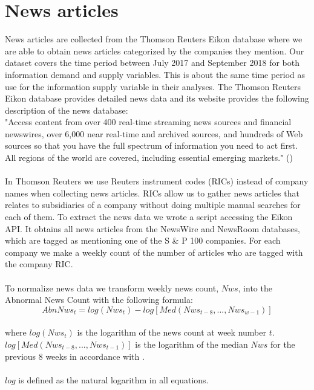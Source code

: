 \section{News articles}
News articles are collected from the Thomson Reuters Eikon database where we are able to obtain news articles categorized by the companies they mention. Our dataset covers the time period between July 2017 and September 2018 for both information demand and supply variables. This is about the same time period as \cite{vlastakis} use for the information supply variable in their analyses. The Thomson Reuters Eikon database provides detailed news data and its website provides the following description of the news database:
\\
"Access content from over 400 real-time streaming news sources and financial newswires, over 6,000 near real-time and archived sources, and hundreds of Web sources so that you have the full spectrum of information you need to act first. All regions of the world are covered, including essential emerging markets." (\cite{descriptionThomsonReutersdatabase})
\\\\
In Thomson Reuters we use Reuters instrument codes (RICs) instead of company names when collecting news articles. RICs allow us to  gather news articles that relates to subsidiaries of a company without doing multiple manual searches for each of them. To extract the news data we wrote a script accessing the Eikon API. It obtains all news articles from the NewsWire and NewsRoom databases, which are tagged as mentioning one of the S \& P 100 companies. For each company we make a weekly count of the number of articles who are tagged with the company RIC.
\\\\
To normalize news data we transform weekly news count, $Nws$, into the Abnormal News Count with the following formula:
\begin{equation}
   \label{abnormal_news} 
   AbnNws_{t} = log(Nws_{t}) - log[Med(Nws_{t-8},...,Nws_{w-1})] 
\end{equation}
\\
where $log(Nws_{t})$ is the logarithm of the news count at week number $t$. $log[Med(Nws_{t-8},...,Nws_{t-1})]$ is the logarithm of the median $Nws$ for the previous 8 weeks in accordance with \cite{engelberg}. 
\\\\
$log$ is defined as the natural logarithm in all equations. 
\\\\
